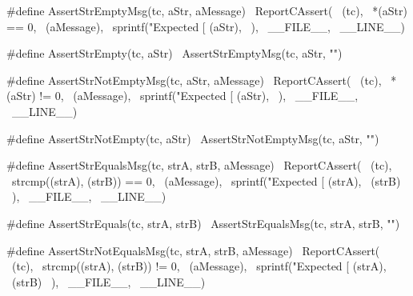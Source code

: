 \startTestSuite[assertStrEmpty]

\startCHeader
#define AssertStrEmptyMsg(tc, aStr, aMessage) \
  ReportCAssert(                              \
    (tc),                                     \
    *(aStr) == 0,                             \
    (aMessage),                               \
    sprintf("Expected [%
      (aStr),                                 \
    ),                                        \
    __FILE__,                                 \
    __LINE__)

#define AssertStrEmpty(tc, aStr) \
  AssertStrEmptyMsg(tc, aStr, "")
\stopCHeader

\stopTestSuite

\startTestSuite[assertStrNotEmpty]

\startCHeader
#define AssertStrNotEmptyMsg(tc, aStr, aMessage) \
  ReportCAssert(                                 \
    (tc),                                        \
    *(aStr) != 0,                                \
    (aMessage),                                  \
    sprintf("Expected [%
      (aStr),                                    \
    ),                                           \
    __FILE__,                                    \
    __LINE__)

#define AssertStrNotEmpty(tc, aStr) \
  AssertStrNotEmptyMsg(tc, aStr, "")
\stopCHeader

\stopTestSuite

\startTestSuite[assertStrEquals]

\startCHeader
#define AssertStrEqualsMsg(tc, strA, strB, aMessage) \
  ReportCAssert(                                     \
    (tc),                                            \
    strcmp((strA), (strB)) == 0,                     \
    (aMessage),                                      \
    sprintf("Expected [%
      (strA),                                        \
      (strB)                                         \
    ),                                               \
    __FILE__,                                        \
    __LINE__)

#define AssertStrEquals(tc, strA, strB) \
  AssertStrEqualsMsg(tc, strA, strB, "")
\stopCHeader

\stopTestSuite

\startTestSuite[assertStrNotEquals]

\startCHeader
#define AssertStrNotEqualsMsg(tc, strA, strB, aMessage) \
  ReportCAssert(                                        \
    (tc),                                               \
    strcmp((strA), (strB)) != 0,                        \
    (aMessage),                                         \
    sprintf("Expected [%
      (strA),                                           \
      (strB)                                            \
    ),                                                  \
    __FILE__,                                           \
    __LINE__)

